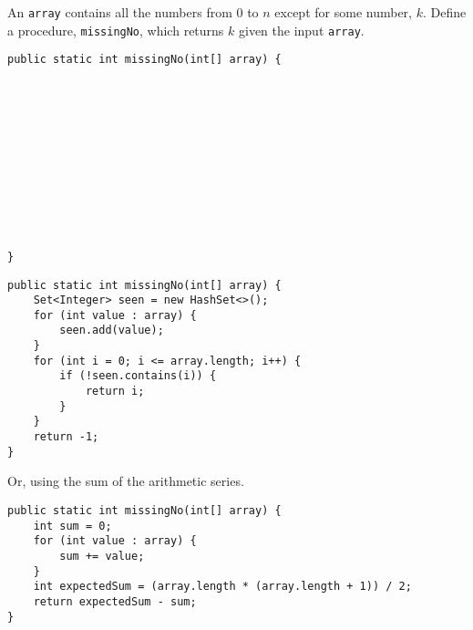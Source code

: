 \begin{blocksection}
\question An \lstinline$array$ contains all the numbers from $0$ to $n$ except
for some number, $k$. Define a procedure, \lstinline$missingNo$, which returns
$k$ given the input \lstinline$array$.

\ifprintanswers\else
\begin{lstlisting}
public static int missingNo(int[] array) {












}
\end{lstlisting}
\fi

\begin{solution}
\begin{lstlisting}
public static int missingNo(int[] array) {
    Set<Integer> seen = new HashSet<>();
    for (int value : array) {
        seen.add(value);
    }
    for (int i = 0; i <= array.length; i++) {
        if (!seen.contains(i)) {
            return i;
        }
    }
    return -1;
}
\end{lstlisting}

Or, using the sum of the arithmetic series.

\begin{lstlisting}
public static int missingNo(int[] array) {
    int sum = 0;
    for (int value : array) {
        sum += value;
    }
    int expectedSum = (array.length * (array.length + 1)) / 2;
    return expectedSum - sum;
}
\end{lstlisting}
\end{solution}
\end{blocksection}
